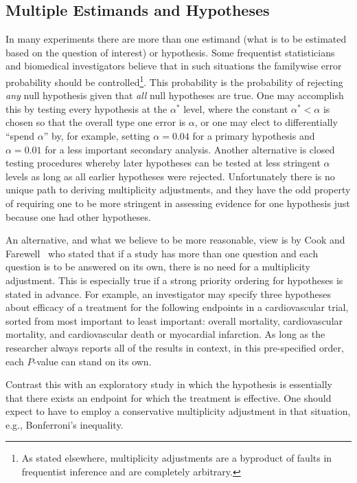 \subsection{Multiple Estimands and Hypotheses}\label{sec:htest-mult}
In many experiments there are more than one estimand (what is to be
estimated based on the question of interest) or hypothesis.  Some
frequentist statisticians and biomedical investigators believe that in such
situations the familywise error probability should be
controlled\footnote{As stated elsewhere, multiplicity adjustments are
  a byproduct of faults in frequentist inference and are completely arbitrary.}.
This probability is the probability of rejecting \emph{any} null
hypothesis given that \emph{all} null hypotheses are true.  One may
accomplish this by testing every hypothesis at the $\alpha^{*}$ level,
where the constant $\alpha^{*} < \alpha$ is chosen so that the overall
type one error is $\alpha$, or one may elect to
differentially ``spend $\alpha$'' by, for example, setting $\alpha=0.04$ for a
primary hypothesis and $\alpha=0.01$ for a less important secondary
analysis.  Another alternative is closed testing procedures whereby
later hypotheses can be tested at less stringent $\alpha$ levels as
long as all earlier hypotheses were rejected.  Unfortunately there is
no unique path to deriving multiplicity adjustments, and they have the
odd property of requiring one to be more stringent in assessing
evidence for one hypothesis just because one had other hypotheses.

An alternative, and what we believe to be more reasonable, view is by
Cook and Farewell~\cite{coo96mul} who stated that if a study has more
than one question and each question is to be answered on its own,
there is no need for a multiplicity adjustment.  This is especially
true if a strong priority ordering for hypotheses is stated in
advance.  For example, an investigator may specify three hypotheses about
efficacy of a treatment for the following
endpoints in a cardiovascular trial, sorted from most important to
least important: overall mortality, cardiovascular mortality,
and cardiovascular death or myocardial infarction.  As long as the
researcher always reports all of the results in context, in this
pre-specified order, each $P$-value can stand on its own.

Contrast this with an exploratory study in which the hypothesis is
essentially that there exists an endpoint for which the treatment is
effective.  One should expect to have to employ a conservative
multiplicity adjustment in that situation, e.g., Bonferroni's inequality.

